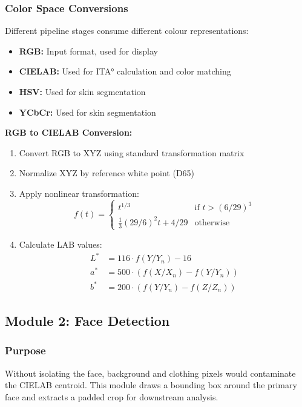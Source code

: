 \subsubsection{Color Space Conversions}

Different pipeline stages consume different colour representations:

\begin{itemize}
    \item \textbf{RGB:} Input format, used for display
    \item \textbf{CIELAB:} Used for ITA° calculation and color matching
    \item \textbf{HSV:} Used for skin segmentation
    \item \textbf{YCbCr:} Used for skin segmentation
\end{itemize}

\textbf{RGB to CIELAB Conversion:}
\begin{enumerate}
    \item Convert RGB to XYZ using standard transformation matrix
    \item Normalize XYZ by reference white point (D65)
    \item Apply nonlinear transformation:
    \begin{equation}
        f(t) = \begin{cases}
            t^{1/3} & \text{if } t > (6/29)^3 \\
            \frac{1}{3}(29/6)^2 t + 4/29 & \text{otherwise}
        \end{cases}
    \end{equation}
    \item Calculate LAB values:
    \begin{align}
        L^* &= 116 \cdot f(Y/Y_n) - 16 \\
        a^* &= 500 \cdot (f(X/X_n) - f(Y/Y_n)) \\
        b^* &= 200 \cdot (f(Y/Y_n) - f(Z/Z_n))
    \end{align}
\end{enumerate}

\subsection{Module 2: Face Detection}

\subsubsection{Purpose}
Without isolating the face, background and clothing pixels would contaminate the CIELAB centroid. This module draws a bounding box around the primary face and extracts a padded crop for downstream analysis.


